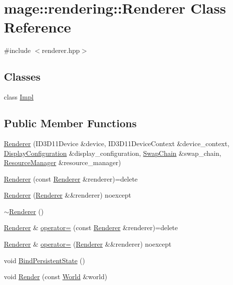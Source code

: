 \hypertarget{classmage_1_1rendering_1_1_renderer}{}\section{mage\+:\+:rendering\+:\+:Renderer Class Reference}
\label{classmage_1_1rendering_1_1_renderer}


{\ttfamily \#include $<$renderer.\+hpp$>$}

\subsection*{Classes}
\begin{DoxyCompactItemize}
\item 
class \hyperlink{classmage_1_1rendering_1_1_renderer_1_1_impl}{Impl}
\end{DoxyCompactItemize}
\subsection*{Public Member Functions}
\begin{DoxyCompactItemize}
\item 
\hyperlink{classmage_1_1rendering_1_1_renderer_a8e517a323bb67bf8b347ff46204ccec9}{Renderer} (I\+D3\+D11\+Device \&device, I\+D3\+D11\+Device\+Context \&device\+\_\+context, \hyperlink{classmage_1_1rendering_1_1_display_configuration}{Display\+Configuration} \&display\+\_\+configuration, \hyperlink{classmage_1_1rendering_1_1_swap_chain}{Swap\+Chain} \&swap\+\_\+chain, \hyperlink{classmage_1_1rendering_1_1_resource_manager}{Resource\+Manager} \&resource\+\_\+manager)
\item 
\hyperlink{classmage_1_1rendering_1_1_renderer_adf10b0a249959f9a9fff5714c537bbd8}{Renderer} (const \hyperlink{classmage_1_1rendering_1_1_renderer}{Renderer} \&renderer)=delete
\item 
\hyperlink{classmage_1_1rendering_1_1_renderer_aab7768b815e740173a20e10795a6f93e}{Renderer} (\hyperlink{classmage_1_1rendering_1_1_renderer}{Renderer} \&\&renderer) noexcept
\item 
\hyperlink{classmage_1_1rendering_1_1_renderer_ab5c0553ac8a095f55eab371b843b354b}{$\sim$\+Renderer} ()
\item 
\hyperlink{classmage_1_1rendering_1_1_renderer}{Renderer} \& \hyperlink{classmage_1_1rendering_1_1_renderer_a23338d210ca0008a05cf060f35d4dc70}{operator=} (const \hyperlink{classmage_1_1rendering_1_1_renderer}{Renderer} \&renderer)=delete
\item 
\hyperlink{classmage_1_1rendering_1_1_renderer}{Renderer} \& \hyperlink{classmage_1_1rendering_1_1_renderer_a8f0f0323dc57cf2e1f76491bf6eaa97a}{operator=} (\hyperlink{classmage_1_1rendering_1_1_renderer}{Renderer} \&\&renderer) noexcept
\item 
void \hyperlink{classmage_1_1rendering_1_1_renderer_a7fa8fd234b69dabc51d7a214afb641b3}{Bind\+Persistent\+State} ()
\item 
void \hyperlink{classmage_1_1rendering_1_1_renderer_aede128f4a20add4df3f101601b444902}{Render} (const \hyperlink{classmage_1_1rendering_1_1_world}{World} \&world)
\end{DoxyCompactItemize}
